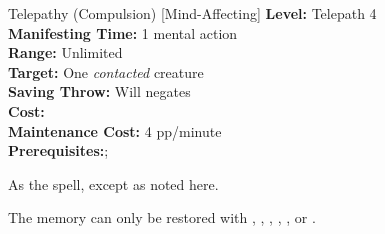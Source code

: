 {Telepathy (Compulsion) [Mind-Affecting]}
{
	\textbf{Level:}
	Telepath 4\\
	\textbf{Manifesting Time:}
	1 mental action\\
	\textbf{Range:}
	Unlimited\\
	\textbf{Target:}
	One \emph{contacted} creature\\
	\textbf{Saving Throw:}
	Will negates\\
	\textbf{Cost:}
	\\
	\textbf{Maintenance Cost:}
	4 pp/minute\\
	\textbf{Prerequisites:};
	\\
}
{
	As the  spell, except as noted here.

	The memory can only be restored with , , , , , or . 
}